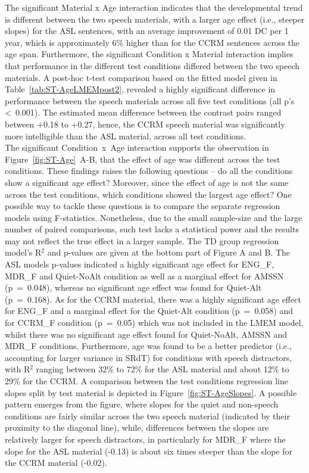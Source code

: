 \documentclass[a4paper, twoside]{templates/ociamthesis}
\begin{document}
The significant Material x Age interaction indicates that the developmental trend is different between the two speech materials, with a larger age effect (i.e., steeper slopes) for the ASL sentences, with an average improvement of 0.01 DC per 1 year, which is approximately 6\% higher than for the CCRM sentences across the age span. Furthermore, the significant Condition x Material interaction implies that performance in the different test conditions differed between the two speech materials. A post-hoc t-test comparison based on the fitted model given in Table~\ref{tab:ST-AgeLMEMpost2}, revealed a highly significant difference in performance between the speech materials across all five test conditions (all p's \textless~0.001). The estimated mean difference between the contrast pairs ranged between +0.18 to +0.27, hence, the CCRM speech material was significantly more intelligible than the ASL material, across all test conditions.\\

The significant Condition~x~Age interaction supports the observation in Figure~\ref{fig:ST-Age}~A-B, that the effect of age was different across the test conditions. These findings raises the following questions -- do all the conditions show a significant age effect? Moreover, since the effect of age is not the same across the test conditions, which conditions showed the largest age effect? One possible way to tackle these questions is to compare the separate regression models using F-statistics. Nonetheless, due to the small sample-size and the large number of paired comparisons, such test lacks a statistical power and the results may not reflect the true effect in a larger sample. The TD group regression model's R\(^{2}\) and p-values are given at the bottom part of Figure A and B. The ASL models p-values indicated a highly significant age effect for ENG\_F, MDR\_F and Quiet-NoAlt condition as well as a marginal effect for AMSSN (p~=~0.048), whereas no significant age effect was found for Quiet-Alt (p~=~0.168). As for the CCRM material, there was a highly significant age effect for ENG\_F and a marginal effect for the Quiet-Alt condition (p~=~0.058) and for CCRM\_F condition (p~=~0.05) which was not included in the LMEM model, whilst there was no significant age effect found for Quiet-NoAlt, AMSSN and MDR\_F conditions. Furthermore, age was found to be a better predictor (i.e., accounting for larger variance in SRdT) for conditions with speech distractors, with R\(^{2}\) ranging between 32\% to 72\% for the ASL material and about 12\% to 29\% for the CCRM. A comparison between the test conditions regression line slopes split by test material is depicted in Figure~\ref{fig:ST-AgeSlopes}. A possible pattern emerges from the figure, where slopes for the quiet and non-speech conditions are fairly similar across the two speech material (indicated by their proximity to the diagonal line), while, differences between the slopes are relatively larger for speech distractors, in particularly for MDR\_F where the slope for the ASL material (-0.13) is about six times steeper than the slope for the CCRM material (-0.02).\\
\end{document}
